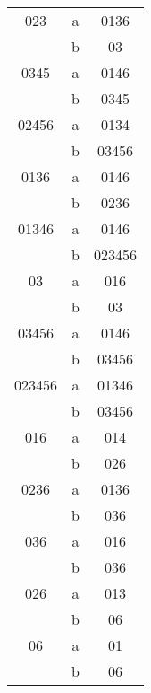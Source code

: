 \documentclass{article}
\begin{document}
    \quad
    \begin{tabular}{c c c}
    023 & a & 0136 \\
        & b & 03\\
    0345 & a & 0146\\
        & b & 0345\\
    02456 & a & 0134\\
        & b & 03456\\
    0136 & a & 0146\\
        & b & 0236\\
    01346 & a & 0146\\
     & b & 023456\\
    03 & a & 016\\
        & b & 03\\
    03456 & a & 0146\\
        & b & 03456\\
    023456 & a & 01346\\
        & b & 03456\\
    016 & a & 014\\
        & b & 026\\
    0236 & a & 0136\\
        & b & 036\\
    036 & a & 016\\
        & b & 036\\
    026 & a & 013\\
        & b & 06\\
    06 & a & 01\\
        & b & 06\\
    \end{tabular}
    \quad
    
    
    
\end{document}
